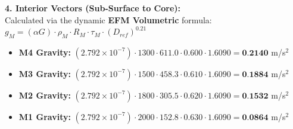\documentclass[11pt, a4paper]{article}
\begin{document}
  \vspace{0.5em}
  \noindent \textbf{4. Interior Vectors (Sub-Surface to Core):} \\[0.5em]
  \hspace*{1em} Calculated via the dynamic \textbf{EFM Volumetric} formula: $g_M = (\alpha G) \cdot \rho_{M} \cdot R_M \cdot \tau_M \cdot (D_{ref})^{0.21}$
  \begin{itemize}
    \item \textbf{M4 Gravity:} $(2.792 \times 10^{-7}) \cdot 1300 \cdot 611.0 \cdot 0.600 \cdot 1.6090 = \textbf{0.2140}$ m/s$^2$
    \item \textbf{M3 Gravity:} $(2.792 \times 10^{-7}) \cdot 1500 \cdot 458.3 \cdot 0.610 \cdot 1.6090 = \textbf{0.1884}$ m/s$^2$
    \item \textbf{M2 Gravity:} $(2.792 \times 10^{-7}) \cdot 1800 \cdot 305.5 \cdot 0.620 \cdot 1.6090 = \textbf{0.1532}$ m/s$^2$
    \item \textbf{M1 Gravity:} $(2.792 \times 10^{-7}) \cdot 2000 \cdot 152.8 \cdot 0.630 \cdot 1.6090 = \textbf{0.0864}$ m/s$^2$
  \end{itemize}
\end{document}
